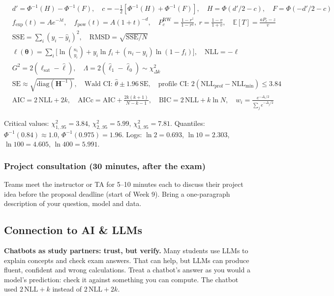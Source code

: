 \[
\begin{aligned}
&d' = \Phi^{-1}(H) - \Phi^{-1}(F), \quad c = -\tfrac12[\Phi^{-1}(H) + \Phi^{-1}(F)], \quad H = \Phi(d'/2 - c), \quad F = \Phi(-d'/2 - c)\\
&f_{\exp}(t) = A e^{-\lambda t}, \quad f_{\text{pow}}(t) = A(1+t)^{-d}, \quad P_c^{\text{RW}} = \frac{1-r^z}{1-r^a},\ r = \frac{1-v}{1+v}, \quad \mathbb{E}[T] = \frac{aP_c - z}{v}\\
&\mathrm{SSE} = \textstyle\sum_i (y_i - \hat y_i)^2, \quad \mathrm{RMSD} = \sqrt{\mathrm{SSE}/N}\\
&\ell(\boldsymbol\theta) = \textstyle\sum_i \big[\ln\binom{n_i}{y_i} + y_i\ln f_i + (n_i - y_i)\ln(1-f_i)\big], \quad \mathrm{NLL} = -\ell\\
&G^2 = 2(\ell_{\text{sat}} - \hat\ell), \quad \Lambda = 2(\hat\ell_1 - \hat\ell_0) \sim \chi^2_{\Delta k}\\
&\mathrm{SE} \approx \sqrt{\mathrm{diag}(\mathbf{H}^{-1})}, \quad \text{Wald CI: } \hat\theta \pm 1.96\,\mathrm{SE}, \quad \text{profile CI: } 2(\mathrm{NLL}_{\text{prof}} - \mathrm{NLL}_{\min}) \le 3.84\\
&\mathrm{AIC} = 2\,\mathrm{NLL} + 2k, \quad \mathrm{AICc} = \mathrm{AIC} + \tfrac{2k(k+1)}{N-k-1}, \quad \mathrm{BIC} = 2\,\mathrm{NLL} + k\ln N, \quad w_i = \tfrac{e^{-\Delta_i/2}}{\sum_j e^{-\Delta_j/2}}
\end{aligned}
\]

Critical values: \(\chi^2_{1,.95} = 3.84\), \(\chi^2_{2,.95} = 5.99\),
\(\chi^2_{3,.95} = 7.81\). Quantiles: \(\Phi^{-1}(0.84) \approx 1.0\),
\(\Phi^{-1}(0.975) = 1.96\). Logs: \(\ln 2 = 0.693\),
\(\ln 10 = 2.303\), \(\ln 100 = 4.605\), \(\ln 400 = 5.991\).

\subsubsection{Project consultation (30 minutes, after the exam)}

Teams meet the instructor or TA for 5--10 minutes each to discuss their
project idea before the proposal deadline (start of Week 9). Bring a
one-paragraph description of your question, model and data.

\subsection{Connection to AI \& LLMs}

\textbf{Chatbots as study partners: trust, but verify.} Many students
use LLMs to explain concepts and check exam answers. That can help, but
LLMs can produce fluent, confident and wrong calculations. Treat a
chatbot's answer as you would a model's prediction: check it against
something you can compute. The chatbot used \(2\,\mathrm{NLL} + k\)
instead of \(2\,\mathrm{NLL} + 2k\).

